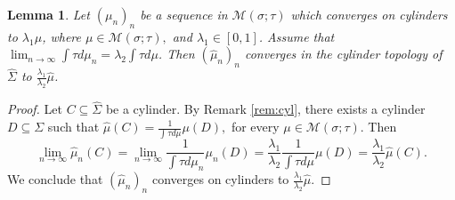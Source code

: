 \documentclass[letterpaper,11pt]{amsart}
\theoremstyle{plain}
\theoremstyle{plain}
\newtheorem{lemma}[proposition]{Lemma}
\theoremstyle{definition}
\theoremstyle{remark}
\newtheorem{remark}{Remark}[section]
\def\M{{\mathcal M}}
\begin{document}
\begin{lemma}\label{topology} Let $(\mu_n)_n$ be a sequence in $\M(\sigma;\tau)$ which converges on  cylinders to $\lambda_1 \mu$,  where $\mu\in\M(\sigma;\tau),$ and $\lambda_1\in [0,1]$. Assume that $\lim_{n\to\infty}\int {\tau} d\mu_n=\lambda_2\int{\tau} d\mu$.  Then $(\widehat{\mu}_n)_n$ converges in the cylinder topology of $\widehat{\Sigma}$ to $\frac{\lambda_1}{\lambda_2}\widehat{\mu}$. 
\end{lemma}
\begin{proof} %
Let  $C\subseteq \widehat{\Sigma}$ be a cylinder. By Remark \ref{rem:cyl}, there exists a cylinder $D\subseteq \Sigma$ such that $\widehat{\mu}(C)=\frac{1}{\int {\tau} d\mu}\mu(D),$ for every $\mu\in \M(\sigma;\tau)$. Then
$$\lim_{n\to\infty}\widehat{\mu}_n(C)=\lim_{n\to\infty}\frac{1}{\int {\tau} d\mu_n}\mu_n(D)=\frac{\lambda_1}{\lambda_2}\frac{1}{\int{\tau} d\mu}\mu(D)=\frac{\lambda_1}{\lambda_2}\widehat{\mu}(C).$$
We conclude that $(\widehat{\mu}_n)_n$ converges on cylinders to $\frac{\lambda_1}{\lambda_2}\widehat{\mu}$. 
\end{proof}

\end{document}
